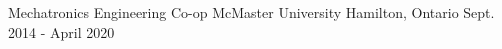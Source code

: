 
\begin{cventries}

  \cventry
    {Mechatronics Engineering Co-op} %
    {McMaster University} %
    {Hamilton, Ontario} %
    {Sept. 2014 - April 2020} %
    {}


\end{cventries}
